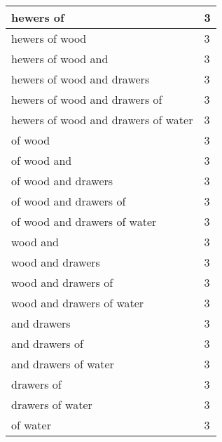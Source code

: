 \begin{center}
\begin{longtable}{|p{3.0in}|p{0.5in}|}
hewers of & 3\\ \hline 
hewers of wood & 3\\ \hline 
hewers of wood and & 3\\ \hline 
hewers of wood and drawers & 3\\ \hline 
hewers of wood and drawers of & 3\\ \hline 
hewers of wood and drawers of water & 3\\ \hline 
of wood & 3\\ \hline 
of wood and & 3\\ \hline 
of wood and drawers & 3\\ \hline 
of wood and drawers of & 3\\ \hline 
of wood and drawers of water & 3\\ \hline 
wood and & 3\\ \hline 
wood and drawers & 3\\ \hline 
wood and drawers of & 3\\ \hline 
wood and drawers of water & 3\\ \hline 
and drawers & 3\\ \hline 
and drawers of & 3\\ \hline 
and drawers of water & 3\\ \hline 
drawers of & 3\\ \hline 
drawers of water & 3\\ \hline 
of water & 3\\ \hline 
\end{longtable}
\end{center}





